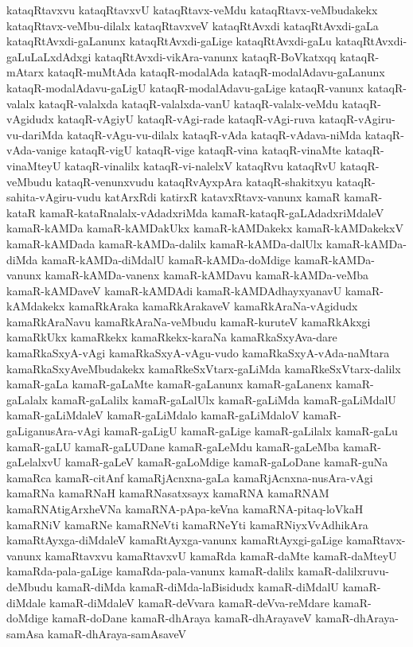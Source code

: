 {kataqRtavxvu
kataqRtavxvU
kataqRtavx-veMdu
kataqRtavx-veMbudakekx
kataqRtavx-veMbu-dilalx
kataqRtavxveV
kataqRtAvxdi
kataqRtAvxdi-gaLa
kataqRtAvxdi-gaLanunx
kataqRtAvxdi-gaLige
kataqRtAvxdi-gaLu
kataqRtAvxdi-gaLuLaLxdAdxgi
kataqRtAvxdi-vikAra-vanunx
kataqR-BoVkatxqq
kataqR-mAtarx
kataqR-muMtAda
kataqR-modalAda
kataqR-modalAdavu-gaLanunx
kataqR-modalAdavu-gaLigU
kataqR-modalAdavu-gaLige
kataqR-vanunx
kataqR-valalx
kataqR-valalxda
kataqR-valalxda-vanU
kataqR-valalx-veMdu
kataqR-vAgidudx
kataqR-vAgiyU
kataqR-vAgi-rade
kataqR-vAgi-ruva
kataqR-vAgiru-vu-dariMda
kataqR-vAgu-vu-dilalx
kataqR-vAda
kataqR-vAdava-niMda
kataqR-vAda-vanige
kataqR-vigU
kataqR-vige
kataqR-vina
kataqR-vinaMte
kataqR-vinaMteyU
kataqR-vinalilx
kataqR-vi-nalelxV
kataqRvu
kataqRvU
kataqR-veMbudu
kataqR-venunxvudu
kataqRvAyxpAra
kataqR-shakitxyu
kataqR-sahita-vAgiru-vudu
katArxRdi
katirxR
katavxRtavx-vanunx
kamaR
kamaR-kataR
kamaR-kataRnalalx-vAdadxriMda
kamaR-kataqR-gaLAdadxriMdaleV
kamaR-kAMDa
kamaR-kAMDakUkx
kamaR-kAMDakekx
kamaR-kAMDakekxV
kamaR-kAMDada
kamaR-kAMDa-dalilx
kamaR-kAMDa-dalUlx
kamaR-kAMDa-diMda
kamaR-kAMDa-diMdalU
kamaR-kAMDa-doMdige
kamaR-kAMDa-vanunx
kamaR-kAMDa-vanenx
kamaR-kAMDavu
kamaR-kAMDa-veMba
kamaR-kAMDaveV
kamaR-kAMDAdi
kamaR-kAMDAdhayxyanavU
kamaR-kAMdakekx
kamaRkAraka
kamaRkArakaveV
kamaRkAraNa-vAgidudx
kamaRkAraNavu
kamaRkAraNa-veMbudu
kamaR-kuruteV
kamaRkAkxgi
kamaRkUkx
kamaRkekx
kamaRkekx-karaNa
kamaRkaSxyAva-dare
kamaRkaSxyA-vAgi
kamaRkaSxyA-vAgu-vudo
kamaRkaSxyA-vAda-naMtara
kamaRkaSxyAveMbudakekx
kamaRkeSxVtarx-gaLiMda
kamaRkeSxVtarx-dalilx
kamaR-gaLa
kamaR-gaLaMte
kamaR-gaLanunx
kamaR-gaLanenx
kamaR-gaLalalx
kamaR-gaLalilx
kamaR-gaLalUlx
kamaR-gaLiMda
kamaR-gaLiMdalU
kamaR-gaLiMdaleV
kamaR-gaLiMdalo
kamaR-gaLiMdaloV
kamaR-gaLiganusAra-vAgi
kamaR-gaLigU
kamaR-gaLige
kamaR-gaLilalx
kamaR-gaLu
kamaR-gaLU
kamaR-gaLUDane
kamaR-gaLeMdu
kamaR-gaLeMba
kamaR-gaLelalxvU
kamaR-gaLeV
kamaR-gaLoMdige
kamaR-gaLoDane
kamaR-guNa
kamaRca
kamaR-citAnf
kamaRjAcnxna-gaLa
kamaRjAcnxna-nusAra-vAgi
kamaRNa
kamaRNaH
kamaRNasatxsayx
kamaRNA
kamaRNAM
kamaRNAtigArxheVNa
kamaRNA-pApa-keVna
kamaRNA-pitaq-loVkaH
kamaRNiV
kamaRNe
kamaRNeVti
kamaRNeYti
kamaRNiyxVvAdhikAra
kamaRtAyxga-diMdaleV
kamaRtAyxga-vanunx
kamaRtAyxgi-gaLige
kamaRtavx-vanunx
kamaRtavxvu
kamaRtavxvU
kamaRda
kamaR-daMte
kamaR-daMteyU
kamaRda-pala-gaLige
kamaRda-pala-vanunx
kamaR-dalilx
kamaR-dalilxruvu-deMbudu
kamaR-diMda
kamaR-diMda-laBisidudx
kamaR-diMdalU
kamaR-diMdale
kamaR-diMdaleV
kamaR-deVvara
kamaR-deVva-reMdare
kamaR-doMdige
kamaR-doDane
kamaR-dhAraya
kamaR-dhArayaveV
kamaR-dhAraya-samAsa
kamaR-dhAraya-samAsaveV
}

